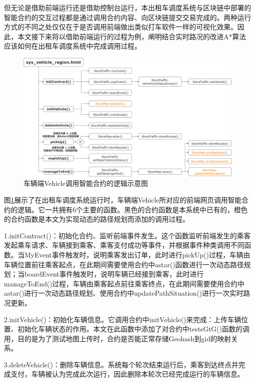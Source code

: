但无论是借助前端运行还是借助控制台运行，本出租车调度系统与区块链中部署的智能合约的交互过程都是通过调用合约内容、向区块链提交交易完成的。两种运行方式的不同之处仅仅在于是否调用前端做出类似打车软件一样的可视化效果。因此，本文接下来将以借助前端运行的过程为例，阐明结合实时路况的改进A*算法应该如何在出租车调度系统中完成调用过程。
\begin{figure}[ht]
  \centering
  \includegraphics[width=1\textwidth]{undergraduate-thesis/images/callContracts_vehicle.png}
  \caption{车辆端Vehicle调用智能合约的逻辑示意图}
  \label{callContractsV} %
\end{figure}

图\ref{callContractsV}展示了在出租车调度系统运行时，车辆端Vehicle所对应的前端网页调用智能合约的逻辑。它一共拥有6个主要的函数。黑色的合约函数是本系统中已有的，橙色的合约函数是本文为实现动态的路径规划而添加的调用过程。

1.initContract()：初始化合约、监听前端事件发生。这个函数监听前端发生的乘客发起乘车请求、车辆接到乘客、乘客支付成功等事件，并根据事件种类调用不同函数。当MyEvent事件触发时，说明乘客发出订单，此时进行pickUp()过程，车辆由车辆位置前往乘客起点，在此期间需要使用合约中astar()函数进行一次动态路径规划；当boardEvent事件触发时，说明车辆已经接到乘客，此时进行manageToEnd()过程，车辆由乘客起点前往乘客终点，在此期间需要使用合约中astar()进行一次动态路径规划、使用合约中updatePathSituation()进行一次实时路况更新。

2.initVehicle()：初始化车辆信息。它调用合约中initVehicle()来完成：上传车辆位置、初始化车辆状态的作用。本文在此函数中添加了对合约中testsGtG()函数的调用，目的是为了测试地图上传时，合约是否能正常存储Geohash到gid的映射关系。

3.deleteVehicle()：删除车辆信息。系统每个轮次结束运行后，乘客到达终点并完成支付，车辆被认为完成此次运行，因此删除本轮次已经完成运行的车辆信息。

